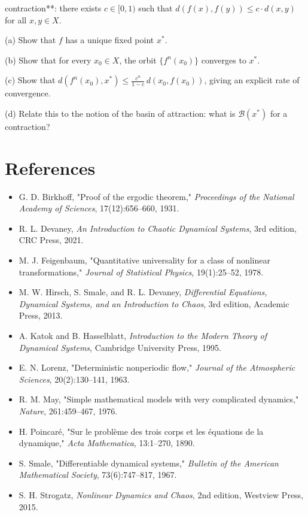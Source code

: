 \begin{exercise}
contraction**: there exists $c \in [0, 1)$ such that $d(f(x), f(y)) \leq c \cdot d(x, y)$ for all $x, y \in X$.

(a) Show that $f$ has a unique fixed point $x^*$.

(b) Show that for every $x_0 \in X$, the orbit $\{f^n(x_0)\}$ converges to $x^*$.

(c) Show that $d(f^n(x_0), x^*) \leq \frac{c^n}{1 - c} \, d(x_0, f(x_0))$, giving an explicit rate of convergence.

(d) Relate this to the notion of the basin of attraction: what is $\mathcal{B}(x^*)$ for a contraction?
\end{exercise}


\section*{References}

\begin{itemize}[nosep]
  \item G. D. Birkhoff, "Proof of the ergodic theorem," \textit{Proceedings of the National Academy of Sciences}, 17(12):656--660, 1931.

  \item R. L. Devaney, \textit{An Introduction to Chaotic Dynamical Systems}, 3rd edition, CRC Press, 2021.

  \item M. J. Feigenbaum, "Quantitative universality for a class of nonlinear transformations," \textit{Journal of Statistical Physics}, 19(1):25--52, 1978.

  \item M. W. Hirsch, S. Smale, and R. L. Devaney, \textit{Differential Equations, Dynamical Systems, and an Introduction to Chaos}, 3rd edition, Academic Press, 2013.

  \item A. Katok and B. Hasselblatt, \textit{Introduction to the Modern Theory of Dynamical Systems}, Cambridge University Press, 1995.

  \item E. N. Lorenz, "Deterministic nonperiodic flow," \textit{Journal of the Atmospheric Sciences}, 20(2):130--141, 1963.

  \item R. M. May, "Simple mathematical models with very complicated dynamics," \textit{Nature}, 261:459--467, 1976.

  \item H. Poincaré, "Sur le problème des trois corps et les équations de la dynamique," \textit{Acta Mathematica}, 13:1--270, 1890.

  \item S. Smale, "Differentiable dynamical systems," \textit{Bulletin of the American Mathematical Society}, 73(6):747--817, 1967.

  \item S. H. Strogatz, \textit{Nonlinear Dynamics and Chaos}, 2nd edition, Westview Press, 2015.
\end{itemize}


